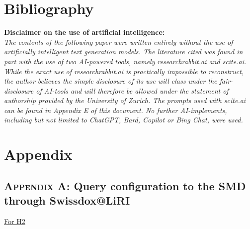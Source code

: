 \documentclass[11pt,a4paper]{article}
\begin{document}
\newpage

\section*{Bibliography}

\newpage
{}
\vspace*{\fill}
\begin{center}
    \Large\textbf{Disclaimer on the use of artificial intelligence:}\\
    \normalsize
    \textit{
        The contents of the following paper were written entirely without the use of artificially intelligent text generation models. The literature cited was found in part with the use of two AI-powered tools, namely researchrabbit.ai and scite.ai. While the exact use of researchrabbit.ai is practically impossible to reconstruct, the author believes the simple disclosure of its use will class under the fair-disclosure of AI-tools and will therefore be allowed under the statement of authorship provided by the University of Zurich. The prompts used with scite.ai can be found in Appendix E of this document. No further AI-implements, including but not limited to ChatGPT, Bard, Copilot or Bing Chat, were used.
    }
\end{center}
\vspace*{\fill}

\newpage
{}
\section*{Appendix}

\subsection*{\textsc{Appendix A}: Query configuration to the SMD through Swissdox@LiRI}

\underline{For H2}
\end{document}
